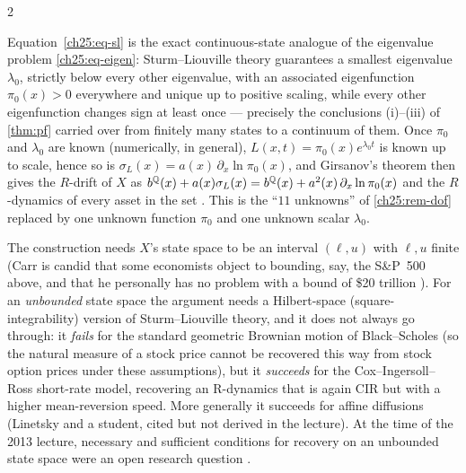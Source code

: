 \begin{paracol}{2}
\begin{finance}
Equation~\eqref{ch25:eq-sl} is the exact continuous-state analogue of the eigenvalue problem
\eqref{ch25:eq-eigen}: Sturm--Liouville theory guarantees a smallest eigenvalue $\lambda_0$, strictly below
every other eigenvalue, with an associated eigenfunction $\pi_0(x)>0$ everywhere and unique up to positive
scaling, while every other eigenfunction changes sign at least once  --- precisely the
conclusions (i)--(iii) of \cref{thm:pf} carried over from finitely many states to a continuum of them. Once
$\pi_0$ and $\lambda_0$ are known (numerically, in general), $L(x,t)=\pi_0(x)e^{\lambda_0t}$ is known up to
scale, hence so is $\sigma_L(x)=a(x)\,\partial_x\ln\pi_0(x)$, and Girsanov's theorem then gives the $R$-drift
of $X$ as $b^{\mathbb{Q}}(x)+a(x)\sigma_L(x)=b^{\mathbb{Q}}(x)+a^2(x)\,\partial_x\ln\pi_0(x)$ and the $R$-dynamics of every asset in the set .
This is the ``$11$ unknowns'' of \cref{ch25:rem-dof} replaced by one unknown function $\pi_0$ and one
unknown scalar $\lambda_0$.
\end{finance}

\begin{coursenote}
The construction needs $X$'s state space to be an interval $(\ell,u)$ with $\ell,u$ finite (Carr is candid
that some economists object to bounding, say, the S\&P~500 above, and that he personally has no problem
with a bound of \$20 trillion ). For an \emph{unbounded} state space the argument needs a
Hilbert-space (square-integrability) version of Sturm--Liouville theory, and it does not always go through:
it \emph{fails} for the standard geometric Brownian motion of Black--Scholes (so the natural measure of a
stock price cannot be recovered this way from stock option prices under these assumptions), but it
\emph{succeeds} for the Cox--Ingersoll--Ross short-rate model, recovering an R-dynamics that is again CIR
but with a higher mean-reversion speed. More generally it succeeds for affine diffusions (Linetsky and a
student, cited but not derived in the lecture). At the time of the 2013 lecture, necessary and sufficient
conditions for recovery on an unbounded state space were an open research question
.
\end{coursenote}


\end{paracol}
